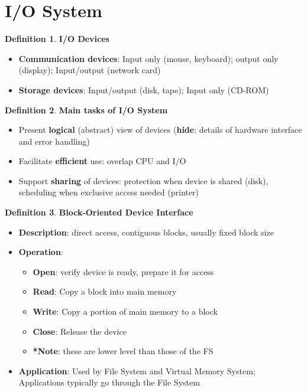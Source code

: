 \documentclass[11pt,a4paper]{article}
\theoremstyle{definition}
\newtheorem{definition}{Definition}[section]
\newenvironment{myitemize}
{ \begin{itemize}
    \setlength{\itemsep}{5pt}
    \setlength{\parskip}{0pt}
    \setlength{\parsep}{0pt}     }
{ \end{itemize}                  }
\begin{document}
\newpage
\section{I/O System}

\begin{definition}{\textbf{I/O Devices}}
	\begin{myitemize}
		\item \textbf{Communication devices}: Input only (mouse, keyboard); output only (display); Input/output (network card)
		\item \textbf{Storage devices}: Input/output (disk, tape); Input only (CD-ROM)
	\end{myitemize}
\end{definition}

\begin{definition}{\textbf{Main tasks of I/O System}}
	\begin{myitemize}
		\item Present \textbf{logical} (abstract) view of devices (\textbf{hide}: details of hardware interface and error handling)
		\item Facilitate \textbf{efficient} use: overlap CPU and I/O
		\item Support \textbf{sharing} of devices: protection when device is shared (disk), scheduling when exclusive access needed (printer)
	\end{myitemize}
\end{definition}

\begin{definition}{\textbf{Block-Oriented Device Interface}}
	\begin{myitemize}
		\item \textbf{Description}: direct access, contiguous blocks, usually fixed block size
		\item \textbf{Operation}:
		\begin{myitemize}
			\item \textbf{Open}: verify device is ready, prepare it for access
			\item \textbf{Read}: Copy a block into main memory 
			\item \textbf{Write}: Copy a portion of main memory to a block
			\item \textbf{Close}: Release the device
			\item \textbf{*Note}: these are lower level than those of the FS 
		\end{myitemize}
		\item \textbf{Application}: Used by File System and Virtual Memory System; Applications typically go through the File System
	\end{myitemize}
\end{definition}
\end{document}
